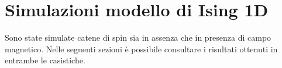 \section{Simulazioni modello di Ising 1D}

Sono state simulate catene di spin sia in assenza che in presenza di campo magnetico. Nelle seguenti sezioni è possibile consultare 
i risultati ottenuti in entrambe le casistiche.


\newpage

